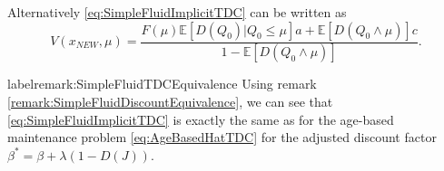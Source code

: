 \begin{corollary}
	Alternatively \eqref{eq:SimpleFluidImplicitTDC} can be written as
	\begin{equation}\label{eq:SimpleFluidExplicitTDC}
	V(x_{NEW},\mu)=\frac{F(\mu)\mathbb{E}[D(Q_0)|Q_0\leq \mu]a+\mathbb{E}[D(Q_0\wedge\mu)]c}{1-\mathbb{E}[D(Q_0\wedge\mu)]}.
	\end{equation}
\end{corollary}

\begin{remark}label{remark:SimpleFluidTDCEquivalence}
	Using remark \ref{remark:SimpleFluidDiscountEquivalence}, we can see that \eqref{eq:SimpleFluidImplicitTDC} is exactly the same as for the age-based maintenance problem \eqref{eq:AgeBasedHatTDC} for the adjusted discount factor $\beta^*=\beta+\lambda(1-D(J))$.
\end{remark}